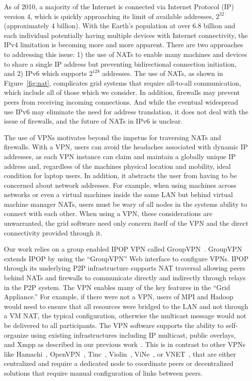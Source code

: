 \documentclass[conference]{IEEEtran}
\begin{document}
As of 2010, a majority of the Internet is connected via Internet Protocol (IP)
version 4, which is quickly approaching its limit of available addresses,
$2^{32}$ (approximately 4 billion).  With the Earth's population at over 6.8
billion and each individual potentially having multiple devices with Internet
connectivity, the IPv4 limitation is becoming more and more apparent.  There
are two approaches to addressing this issue:  1) the use of NATs to enable many
machines and devices to share a single IP address but preventing bidirectional
connection initiation, and 2) IPv6 which supports $2^{128}$ addresses.  The use
of NATs, as shown in Figure~\ref{fig:nat}, complicates grid systems that
require all-to-all communication, which include all of those which we consider.
In addition, firewalls may prevent peers from receiving incoming connections.
And while the eventual widespread use IPv6 may eliminate the need for address
translation, it does not deal with the issue of firewalls, and the future of
NATs in IPv6 is unclear.

The use of VPNs motivates beyond the impetus for traversing NATs and firewalls.
With a VPN, users can avoid the headaches associated with dynamic IP addresses,
as each VPN instance can claim and maintain a globally unique IP address and,
regardless of the machines physical location and mobility, ideal condition for
laptop users.  In addition, it abstracts the user from having to be concerned
about network addresses.  For example, when using machines across networks or
even a virtual machines inside the same LAN but behind virtual machine manager
NATs, users must be wary of all nodes in the systems ability to connect with
each other.  When using a VPN, these considerations are unwarranted, the grid
software need only concern itself of the VPN and the direct connectivity
provided through it.

Our work relies on a group enabled IPOP VPN called GroupVPN~\cite{groupvpn}.
GroupVPN extends IPOP by using the ``GroupVPN'' Web interface to configure
VPNs.  IPOP through its underlying P2P infrastructure supports NAT traversal
allowing peers behind NATs and firewalls to communicate directly and indirectly
through relays in the P2P system.  The VPN enables many of the key features in
the ``Grid Appliance.'' For example, if there were not a VPN, users of MPI and
Hadoop would need to ensure that all resources were bridged to the LAN and not
through a VM NAT, the typical configuration, otherwise the multicast message
would not be delivered to all participants.  The VPN software supports the
ability to self-organize using existing infrastructures including IP multicast,
public overlays, and Xmpp as described in our previous
work~\cite{bootstrapping}.  This is in contrast to other VPNs like
Hamachi~\cite{hamachi}, OpenVPN~\cite{openvpn}, Tinc~\cite{tinc},
Violin~\cite{violin}, ViNe~\cite{vine}, or VNET~\cite{vnet}, that are either
centralized and require a dedicated node to coordinate peers or decentralized
solutions that require manual configuration of links between peers.
\end{document}
